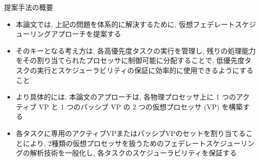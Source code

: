 \begin{frame}{提案手法の概要}
    \begin{itemize}
        \item 本論文では, 上記の問題を体系的に解決するために, 仮想フェデレートスケジューリングアプローチを提案する
        \item そのキーとなる考え方は, 各高優先度タスクの実行を管理し, 残りの処理能力をその割り当てられたプロセッサに制御可能に分配することで, 低優先度タスクの実行とスケジューラビリティの保証に効率的に使用できるようにすること
        \item より具体的には, 本論文のアプローチは, 各物理プロセッサ上に 1 つのアクティブ VP と 1 つのパッシブ VP の 2 つの仮想プロセッサ (VP) を構築する
        \item 各タスクに専用のアクティブVPまたはパッシブVPのセットを割り当てることにより, 2種類の仮想プロセッサを扱うためのフェデレートスケジューリングの解析技術を一般化し, 各タスクのスケジューラビリティを保証する
    \end{itemize}
\end{frame}
